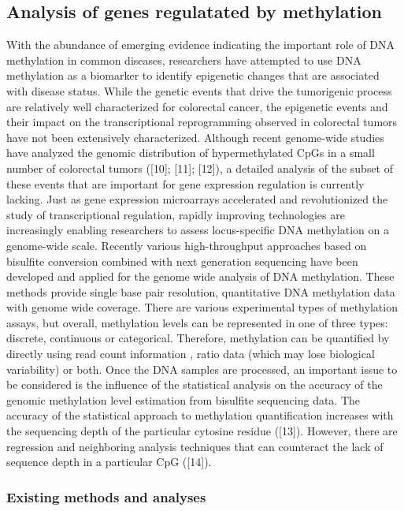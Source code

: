 \documentclass[10pt,letterpaper]{article}
\begin{document}
\hypertarget{analysis-of-genes-regulatated-by-methylation}{%
\subsection{Analysis of genes regulatated by
methylation}\label{analysis-of-genes-regulatated-by-methylation}}

With the abundance of emerging evidence indicating the important role of
DNA methylation in common diseases, researchers have attempted to use
DNA methylation as a biomarker to identify epigenetic changes that are
associated with disease status. While the genetic events that drive the
tumorigenic process are relatively well characterized for colorectal
cancer, the epigenetic events and their impact on the transcriptional
reprogramming observed in colorectal tumors have not been extensively
characterized. Although recent genome-wide studies have analyzed the
genomic distribution of hypermethylated CpGs in a small number of
colorectal tumors ({[}10{]}; {[}11{]}; {[}12{]}), a detailed analysis of
the subset of these events that are important for gene expression
regulation is currently lacking. Just as gene expression microarrays
accelerated and revolutionized the study of transcriptional regulation,
rapidly improving technologies are increasingly enabling researchers to
assess locus-specific DNA methylation on a genome-wide scale. Recently
various high-throughput approaches based on bisulfite conversion
combined with next generation sequencing have been developed and applied
for the genome wide analysis of DNA methylation. These methods provide
single base pair resolution, quantitative DNA methylation data with
genome wide coverage. There are various experimental types of
methylation assays, but overall, methylation levels can be represented
in one of three types: discrete, continuous or categorical. Therefore,
methylation can be quantified by directly using read count information ,
ratio data (which may lose biological variability) or both. Once the DNA
samples are processed, an important issue to be considered is the
influence of the statistical analysis on the accuracy of the genomic
methylation level estimation from bisulfite sequencing data. The
accuracy of the statistical approach to methylation quantification
increases with the sequencing depth of the particular cytosine residue
({[}13{]}). However, there are regression and neighboring analysis
techniques that can counteract the lack of sequence depth in a
particular CpG ({[}14{]}).

\hypertarget{existing-methods-and-analyses}{%
\subsubsection{Existing methods and
analyses}\label{existing-methods-and-analyses}}
\end{document}
